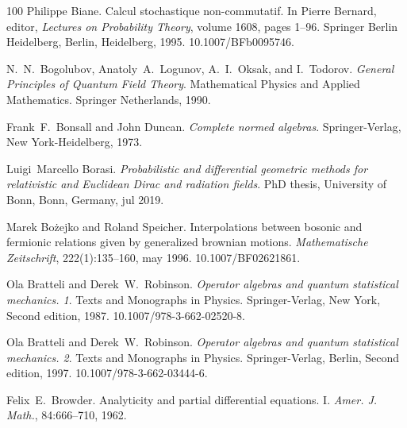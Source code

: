 \documentclass{article}
\newcommand{\tmtextit}[1]{{\itshape{#1}}}
\begin{document}
\begin{thebibliography}{100}
  Philippe Biane. {\newblock}Calcul
  stochastique non-commutatif. {\newblock}In  Pierre Bernard, editor,
  \tmtextit{Lectures on Probability Theory},  volume  1608,  pages  1--96.
  Springer Berlin Heidelberg, Berlin, Heidelberg, 1995.
  {\newblock}\href{Https://doi.org/10.1007/BFb0095746}{}10.1007/BFb0095746.{\newblock}
  
  N.~N.~Bogolubov, Anatoly~A.~Logunov,
  A.~I.~Oksak, and  I.~Todorov. {\newblock}\tmtextit{General Principles of
  Quantum Field Theory}. {\newblock}Mathematical Physics and Applied
  Mathematics. Springer Netherlands, 1990.{\newblock}
  
  Frank~F.~Bonsall  and  John Duncan.
  {\newblock}\tmtextit{Complete normed algebras}. {\newblock}Springer-Verlag,
  New York-Heidelberg, 1973.{\newblock}
  
  Luigi~Marcello Borasi.
  {\newblock}\tmtextit{Probabilistic and differential geometric methods for
  relativistic and Euclidean Dirac and radiation fields}. {\newblock}PhD
  thesis, University of Bonn, Bonn, Germany, jul 2019.{\newblock}
  
  Marek Bo{\.z}ejko  and  Roland
  Speicher. {\newblock}Interpolations between bosonic and fermionic relations
  given by generalized brownian motions. {\newblock}\tmtextit{Mathematische
  Zeitschrift}, 222(1):135--160, may 1996.
  {\newblock}\href{Https://doi.org/10.1007/BF02621861}{}10.1007/BF02621861.{\newblock}
  
  Ola Bratteli  and  Derek~W.~Robinson.
  {\newblock}\tmtextit{Operator algebras and quantum statistical mechanics.
  1}. {\newblock}Texts and Monographs in Physics. Springer-Verlag, New York,
  Second  edition, 1987.
  {\newblock}\href{Https://doi.org/10.1007/978-3-662-02520-8}{}10.1007/978-3-662-02520-8.{\newblock}
  
  Ola Bratteli  and  Derek~W.~Robinson.
  {\newblock}\tmtextit{Operator algebras and quantum statistical mechanics.
  2}. {\newblock}Texts and Monographs in Physics. Springer-Verlag, Berlin,
  Second  edition, 1997.
  {\newblock}\href{Https://doi.org/10.1007/978-3-662-03444-6}{}10.1007/978-3-662-03444-6.{\newblock}
  
  Felix~E.~Browder. {\newblock}Analyticity and
  partial differential equations. I. {\newblock}\tmtextit{Amer. J. Math.},
  84:666--710, 1962.{\newblock}
  

\end{thebibliography}
\end{document}
